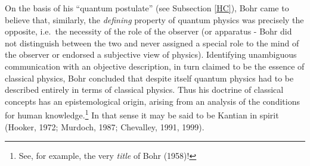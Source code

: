 \documentclass[12pt,titlepage]{article}
\begin{document}
 On the basis of his ``quantum postulate'' (see Subsection \ref{HC}), Bohr came to believe that, similarly, the 
 \textit{defining} property of quantum physics was precisely the opposite, i.e.\ the necessity of the role of the observer (or apparatus - Bohr did not distinguish between the two and  never assigned a special role to the mind of the observer or endorsed a subjective view of physics). Identifying unambiguous communication with an objective description, in turn claimed to be the essence of classical physics, 
 Bohr concluded that despite itself quantum physics had to be described entirely in terms of classical physics. Thus his doctrine of classical concepts
has an epistemological origin, arising from an analysis of the conditions for human knowledge.\footnote{See, for example, the very {\it title} of Bohr (1958)!} In that sense it may be said to be Kantian in spirit (Hooker, 1972; Murdoch, 1987; Chevalley, 1991, 1999). 
\end{document}
